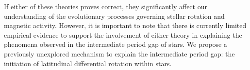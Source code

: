 
%

If either of these theories proves correct, they significantly affect our understanding of the evolutionary processes governing stellar rotation and magnetic activity. 
However, it is important to note that there is currently limited empirical evidence to support the involvement of either theory in explaining the phenomena observed in the intermediate period gap of stars.
We propose a previously unexplored mechanism to explain the intermediate period gap: the initiation of latitudinal differential rotation within stars. 


